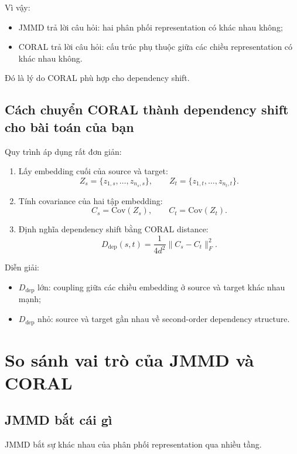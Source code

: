 \documentclass[a4paper]{article}
\begin{document}
Vì vậy:

\begin{itemize}
    \item JMMD trả lời câu hỏi: hai phân phối representation có khác nhau không;
    \item CORAL trả lời câu hỏi: cấu trúc phụ thuộc giữa các chiều representation có khác nhau không.
\end{itemize}

Đó là lý do CORAL phù hợp cho dependency shift.

\subsection{Cách chuyển CORAL thành dependency shift cho bài toán của bạn}

Quy trình áp dụng rất đơn giản:

\begin{enumerate}[label=\arabic*.]
    \item Lấy embedding cuối của source và target:
    \[
    Z_s = \{z_{1,s}, \dots, z_{n_s,s}\},
    \qquad
    Z_t = \{z_{1,t}, \dots, z_{n_t,t}\}.
    \]
    \item Tính covariance của hai tập embedding:
    \[
    C_s = \mathrm{Cov}(Z_s),
    \qquad
    C_t = \mathrm{Cov}(Z_t).
    \]
    \item Định nghĩa dependency shift bằng CORAL distance:
    \[
    D_{\mathrm{dep}}(s,t)=\frac{1}{4d^2}\|C_s-C_t\|_F^2.
    \]
\end{enumerate}

Diễn giải:

\begin{itemize}
    \item $D_{\mathrm{dep}}$ lớn: coupling giữa các chiều embedding ở source và target khác nhau mạnh;
    \item $D_{\mathrm{dep}}$ nhỏ: source và target gần nhau về second-order dependency structure.
\end{itemize}

\section{So sánh vai trò của JMMD và CORAL}

\subsection{JMMD bắt cái gì}

JMMD bắt sự khác nhau của phân phối representation qua nhiều tầng.
\end{document}
